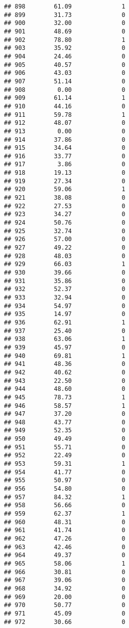 \documentclass[
]{article}
\begin{document}
\begin{verbatim}
## 898        61.09              1
## 899        31.73              0
## 900        32.00              0
## 901        48.69              0
## 902        78.80              1
## 903        35.92              0
## 904        24.46              0
## 905        40.57              0
## 906        43.03              0
## 907        51.14              0
## 908         0.00              0
## 909        61.14              1
## 910        44.16              0
## 911        59.78              1
## 912        48.07              0
## 913         0.00              0
## 914        37.86              0
## 915        34.64              0
## 916        33.77              0
## 917         3.86              0
## 918        19.13              0
## 919        27.34              0
## 920        59.06              1
## 921        38.08              0
## 922        27.53              0
## 923        34.27              0
## 924        50.76              0
## 925        32.74              0
## 926        57.00              0
## 927        49.22              0
## 928        48.03              0
## 929        66.03              1
## 930        39.66              0
## 931        35.86              0
## 932        52.37              0
## 933        32.94              0
## 934        54.97              0
## 935        14.97              0
## 936        62.91              1
## 937        25.40              0
## 938        63.06              1
## 939        45.97              0
## 940        69.81              1
## 941        48.36              0
## 942        40.62              0
## 943        22.50              0
## 944        48.60              0
## 945        78.73              1
## 946        58.57              1
## 947        37.20              0
## 948        43.77              0
## 949        52.35              0
## 950        49.49              0
## 951        55.71              0
## 952        22.49              0
## 953        59.31              1
## 954        41.77              0
## 955        50.97              0
## 956        54.80              0
## 957        84.32              1
## 958        56.66              0
## 959        62.37              1
## 960        48.31              0
## 961        41.74              0
## 962        47.26              0
## 963        42.46              0
## 964        49.37              0
## 965        58.06              1
## 966        30.81              0
## 967        39.06              0
## 968        34.92              0
## 969        20.00              0
## 970        50.77              0
## 971        45.09              0
## 972        30.66              0

\end{verbatim}
\end{document}
